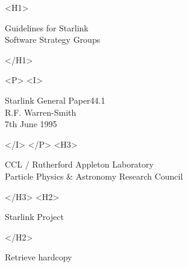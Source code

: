 \documentclass[11pt]{article}
\newcommand{\stardoccategory}  {Starlink General Paper}
\newcommand{\stardocinitials}  {SGP}
\newcommand{\stardocsource}    {sgp44.1}
\newcommand{\stardocnumber}    {44.1}
\newcommand{\stardocauthors}   {R.F. Warren-Smith}
\newcommand{\stardocdate}      {7th June 1995}
\newcommand{\stardoctitle}     {Guidelines for Starlink\\
                                Software Strategy Groups}
\newcommand{\stardocname}{\stardocinitials /\stardocnumber}
\newcommand{\htmladdnormallink}[2]{#1}
\newcommand{\htmladdimg}[1]{}
\newenvironment{latexonly}{}{}
\newcommand{\htmlref}[2]{#1}
\newcommand{\htmladdtonavigation}[1]{}
\newcommand{\xlabel}[1]{}
\begin{document}
\begin{htmlonly}
   \xlabel{}
   \label{stardoctoppage}
   \begin{rawhtml} <H1> \end{rawhtml}
      \stardoctitle
   \begin{rawhtml} </H1> \end{rawhtml}


   \begin{rawhtml} <P> <I> \end{rawhtml}
   \stardoccategory \stardocnumber \\
   \stardocauthors \\
   \stardocdate
   \begin{rawhtml} </I> </P> <H3> \end{rawhtml}
      \htmladdnormallink{CCL}{http://www.clrc.ac.uk} /
      \htmladdnormallink{Rutherford Appleton Laboratory}
                        {http://www.clrc.ac.uk/ral} \\
      Particle Physics \& Astronomy Research Council \\
   \begin{rawhtml} </H3> <H2> \end{rawhtml}
      \htmladdnormallink{Starlink Project}{http://star-www.rl.ac.uk/}
   \begin{rawhtml} </H2> \end{rawhtml}
   \htmladdnormallink{\htmladdimg{source.gif} Retrieve hardcopy}
      {http://star-www.rl.ac.uk/cgi-bin/hcserver?\stardocsource}\\


\end{htmlonly}

\newcommand{\latexonlytoc}[0]{\tableofcontents}
\begin{htmlonly}
   \renewcommand{\latexonlytoc}[0]{}
   \htmladdtonavigation{\htmlref{\htmladdimg{contents_motif.gif}}
                                            {stardoctoppage}}
\end{htmlonly}
\end{document}
